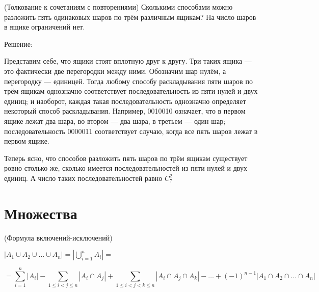 \begin{eg} (Толкование к сочетаниям с повторениями)
    Сколькими способами можно разложить пять одинаковых шаров по трём различным ящикам? На число шаров в ящике ограничений нет.

    Решение:

    Представим себе, что ящики стоят вплотную друг к другу. Три таких ящика --- это
    фактически две перегородки между ними. Обозначим шар нулём, а перегородку --- единицей.
    Тогда любому способу раскладывания пяти шаров по трём ящикам однозначно соответствует
    последовательность из пяти нулей и двух единиц; и наоборот, каждая такая последовательность
    однозначно определяет некоторый способ раскладывания. Например, 0010010 означает, что в
    первом ящике лежат два шара, во втором --- два шара, в третьем --- один шар; последовательность 0000011 соответствует случаю, когда все пять шаров лежат в первом ящике.

    Теперь ясно, что способов разложить пять шаров по трём ящикам существует ровно столько
же, сколько имеется последовательностей из пяти нулей и двух единиц. А число таких последовательностей равно $C_{7}^{2}$
\end{eg}

\section{Множества}

\begin{theorem} (Формула включений-исключений)
    
    $|A_1 \cup A_2 \cup \ldots \cup A_n| = \left|\bigcup_{i=1}^{n} A_i\right| =$

    $$  = \sum_{i=1}^{n} |A_i| -\sum_{1 \leq i < j \leq n} |A_i \cap A_j| + \sum_{1 \leq i < j < k \leq n} |A_i \cap A_j \cap A_k| - \ldots + (-1)^{n-1} |A_1 \cap A_2 \cap \ldots \cap A_n| $$
\end{theorem}

